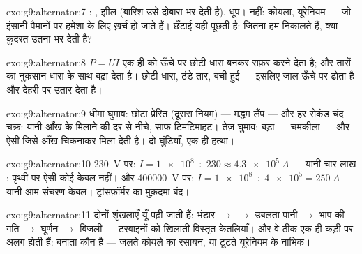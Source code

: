 \begin{solution}{exo:g9:alternator:7}
: , झील (बारिश उसे दोबारा भर देती है), धूप। नहीं: कोयला,
यूरेनियम --- जो इंसानी पैमानों पर हमेशा के लिए ख़र्च हो जाते हैं। छँटाई
यही पूछती है: जितना हम निकालते हैं, क्या क़ुदरत उतना भर देती है?
\end{solution}

\begin{solution}{exo:g9:alternator:8}
$P = U I$ एक ही  को ऊँचे  पर छोटी धारा बनकर सफ़र करने देता
है; और  तारों का नुक़सान धारा के साथ बढ़ा देता है। छोटी
धारा, ठंडे तार, बची हुई  --- इसलिए जाल ऊँचे पर ढोता है और देहरी
पर उतार देता है।
\end{solution}

\begin{solution}{exo:g9:alternator:9}
धीमा घुमाव: छोटा प्रेरित  (दूसरा नियम) --- मद्धम लैंप --- और
हर सेकंड चंद चक्र: यानी आँख के मिलाने की दर से नीचे, साफ़ टिमटिमाहट।
तेज़ घुमाव: बड़ा  --- चमकीला --- और ऐसी  जिसे आँख
चिकनाकर मिला देती है। दो घुंडियाँ, एक ही हत्था।
\end{solution}

\begin{solution}{exo:g9:alternator:10}
\qty{230}{V} पर: $I = \num{1e8} \div 230 \approx \qty{4.3e5}{A}$ ---
यानी चार लाख : पृथ्वी पर ऐसी कोई केबल नहीं। और \qty{400000}{V}
पर: $I = \num{1e8} \div \num{4e5} = \qty{250}{A}$ --- यानी आम संचरण
केबल। ट्रांसफ़ॉर्मर का मुक़दमा बंद।
\end{solution}

\begin{solution}{exo:g9:alternator:11}
दोनों शृंखलाएँ यूँ पढ़ी जाती हैं: भंडार $\to$  $\to$ उबलता पानी
$\to$ भाप की गति $\to$ घूर्णन $\to$ बिजली --- टरबाइनों को खिलाती
विस्तृत केतलियाँ। और वे ठीक एक ही कड़ी पर अलग होती हैं:  बनाता
कौन है --- जलते कोयले का रसायन, या टूटते यूरेनियम के नाभिक।
\end{solution}

